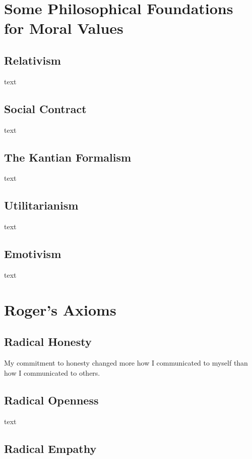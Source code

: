 \section{Some Philosophical Foundations for Moral Values}

\subsection{Relativism}

text

\subsection{Social Contract}

text

\subsection{The Kantian Formalism}

text

\subsection{Utilitarianism}

text

\subsection{Emotivism} %

text

\section{Roger's Axioms}

\subsection{Radical Honesty}

My commitment to honesty changed more how I communicated to myself than how I communicated to others.

\subsection{Radical Openness}

text

\subsection{Radical Empathy}


